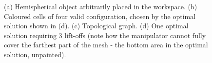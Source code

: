\documentclass[journal]{IEEEtran}
\begin{document}
\begin{figure}[t]
\centering
{}
\caption{(a) Hemispherical object arbitrarily placed in the workspace. 
(b) Coloured cells of four valid configuration, chosen by the optimal solution shown in (d). %
(c) Topological graph. (d) One optimal solution requiring 3 lift-offs 
(note how the manipulator cannot fully cover the farthest part of the mesh - the bottom area in the optimal solution, unpainted). 
}\label{figflatwise}
\end{figure}
\end{document}
